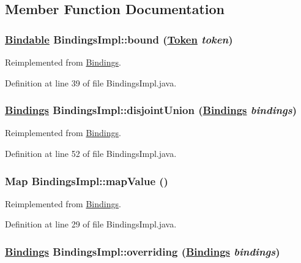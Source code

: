 \subsection{Member Function Documentation}
\hypertarget{classBindingsImpl_a1}{
\subsubsection[bound]{\setlength{\rightskip}{0pt plus 5cm}\hyperlink{interfaceBindable}{Bindable} Bindings\-Impl::bound (\hyperlink{interfaceToken}{Token} {\em token})}}
\label{classBindingsImpl_a1}




Reimplemented from \hyperlink{interfaceBindings_a1}{Bindings}.

Definition at line 39 of file Bindings\-Impl.java.\hypertarget{classBindingsImpl_a3}{
\subsubsection[disjointUnion]{\setlength{\rightskip}{0pt plus 5cm}\hyperlink{interfaceBindings}{Bindings} Bindings\-Impl::disjoint\-Union (\hyperlink{interfaceBindings}{Bindings} {\em bindings})}}
\label{classBindingsImpl_a3}




Reimplemented from \hyperlink{interfaceBindings_a3}{Bindings}.

Definition at line 52 of file Bindings\-Impl.java.\hypertarget{classBindingsImpl_a0}{
\subsubsection[mapValue]{\setlength{\rightskip}{0pt plus 5cm}Map Bindings\-Impl::map\-Value ()}}
\label{classBindingsImpl_a0}




Reimplemented from \hyperlink{interfaceBindings_a0}{Bindings}.

Definition at line 29 of file Bindings\-Impl.java.\hypertarget{classBindingsImpl_a2}{
\subsubsection[overriding]{\setlength{\rightskip}{0pt plus 5cm}\hyperlink{interfaceBindings}{Bindings} Bindings\-Impl::overriding (\hyperlink{interfaceBindings}{Bindings} {\em bindings})}}
\label{classBindingsImpl_a2}




